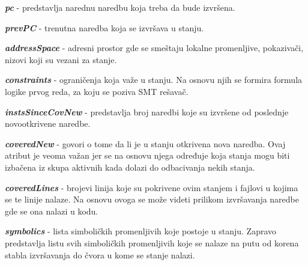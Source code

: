 \documentclass[12pt,oneside]{memoir}
\begin{document}
\begin{description}
    \item \textbf{\textit{pc}} - predstavlja narednu naredbu koja treba da bude izvršena.
    
    \item \textbf{\textit{prevPC}} - trenutna naredba koja se izvršava u stanju.
    
    \item \textbf{\textit{addressSpace}} - adresni prostor gde se smeštaju lokalne promenljive, pokazivači, nizovi koji su vezani za stanje.
    
    \item \textbf{\textit{constraints}} - ograničenja koja važe u stanju. Na osnovu njih se formira formula logike prvog reda, za koju se poziva SMT rešavač.
    
    \item \textbf{\textit{instsSinceCovNew}} - predstavlja broj naredbi koje su izvršene od poslednje novootkrivene naredbe.
    
    \item \textbf{\textit{coveredNew}} - govori o tome da li je u stanju otkrivena nova naredba. Ovaj atribut je veoma važan jer se na osnovu njega određuje koja stanja mogu biti izbačena iz skupa aktivnih kada dolazi do odbacivanja nekih stanja.
    
    \item \textbf{\textit{coveredLines}} - brojevi linija koje su pokrivene ovim stanjem i fajlovi u kojima se te linije nalaze. Na osnovu ovoga se može videti prilikom izvršavanja naredbe gde se ona nalazi u kodu.
    
    \item \textbf{\textit{symbolics}} - lista simboličkih promenljivih koje postoje u stanju. Zapravo predstavlja listu svih simboličkih promenljivih koje se nalaze na putu od korena stabla izvršavanja do čvora u kome se stanje nalazi.
\end{description}
\end{document}
